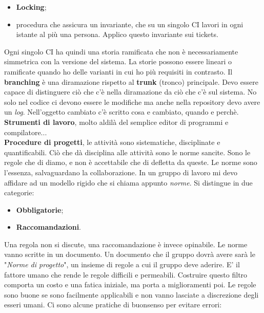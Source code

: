 \begin{itemize}

	\item \textbf{Locking};
	\item procedura che assicura un invariante, che su un singolo CI lavori in ogni istante al più una persona. Applico questo invariante sui tickets.

\end{itemize}

Ogni singolo CI ha quindi una storia ramificata che non è necessariamente simmetrica con la versione del sistema. La storie possono essere lineari o ramificate quando ho delle varianti in cui ho più requisiti in contrasto. Il \textbf{branching} è una diramazione rispetto al \textbf{trunk} (tronco) principale. Devo essere capace di distinguere ciò che c'è nella diramazione da ciò che c'è sul sistema. No solo nel codice ci devono essere le modifiche ma anche nella repository devo avere un \textit{log}. Nell'oggetto cambiato c'è scritto cosa e cambiato, quando e perchè.\\
\textbf{Strumenti di lavoro}, molto aldilà del semplice editor di programmi e compilatore...\\
\textbf{Procedure di progetti}, le attività sono sistematiche, disciplinate e quantificabili. Ciò che dà disciplina alle attività sono le norme sancite. Sono le regole che di diamo, e non è accettabile che di defletta da queste. Le norme sono l'essenza, salvaguardano la collaborazione. In un gruppo di lavoro mi devo affidare ad un modello rigido che si chiama appunto \textit{norme}. Si distingue in due categorie:

\begin{itemize}

	\item \textbf{Obbligatorie};
	\item \textbf{Raccomandazioni}.

\end{itemize}

Una regola non si discute, una raccomandazione è invece opinabile. Le norme vanno scritte in un documento. Un documento che il gruppo dovrà avere sarà le "\textit{Norme di progetto}", un insieme di regole a cui il gruppo deve aderire. E' il fattore umano che rende le regole difficili e permeabili. Costruire questo filtro comporta un costo e una fatica iniziale, ma porta a miglioramenti poi. Le regole sono buone se sono facilmente applicabili e non vanno lasciate a discrezione degli esseri umani. Ci sono alcune pratiche di buonsenso per evitare errori:

